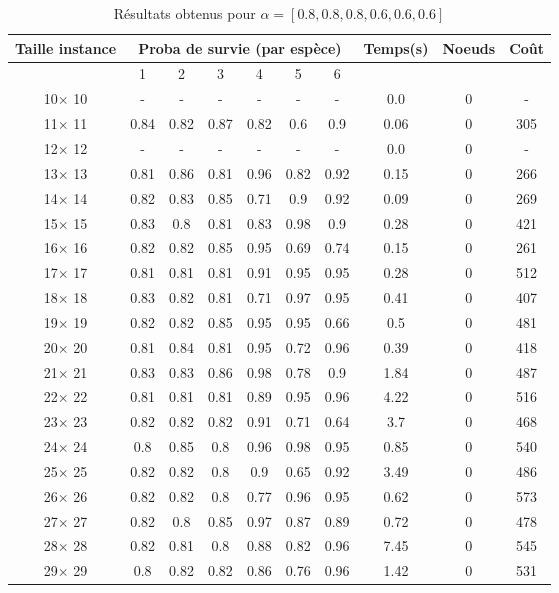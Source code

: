 \documentclass[main.tex]{subfiles}
\begin{document}
\begin{table}
    \centering
    \caption{Résultats obtenus pour $\alpha = [0.8, 0.8, 0.8, 0.6, 0.6, 0.6]$}
    \begin{tabular}{|c|c|c|c|c|c|c|c|c|c|}
	\hline
	\textbf{Taille instance} &\multicolumn{6}{c}{\textbf{Proba de survie (par espèce)}} &\textbf{Temps(s)} &\textbf{Noeuds} &\textbf{Coût}\\
	\hline
	 &1 &2 &3 &4 &5 &6 & & &\\
	\hline

10$\times$ 10 & -  & -  & -  & -  & -  & -  &0.0 &0 & - \\
11$\times$ 11 &0.84 &0.82 &0.87 &0.82 &0.6 &0.9 &0.06 &0 &305\\
12$\times$ 12 & -  & -  & -  & -  & -  & -  &0.0 &0 & - \\
13$\times$ 13 &0.81 &0.86 &0.81 &0.96 &0.82 &0.92 &0.15 &0 &266\\
14$\times$ 14 &0.82 &0.83 &0.85 &0.71 &0.9 &0.92 &0.09 &0 &269\\
15$\times$ 15 &0.83 &0.8 &0.81 &0.83 &0.98 &0.9 &0.28 &0 &421\\
16$\times$ 16 &0.82 &0.82 &0.85 &0.95 &0.69 &0.74 &0.15 &0 &261\\
17$\times$ 17 &0.81 &0.81 &0.81 &0.91 &0.95 &0.95 &0.28 &0 &512\\
18$\times$ 18 &0.83 &0.82 &0.81 &0.71 &0.97 &0.95 &0.41 &0 &407\\
19$\times$ 19 &0.82 &0.82 &0.85 &0.95 &0.95 &0.66 &0.5 &0 &481\\
20$\times$ 20 &0.81 &0.84 &0.81 &0.95 &0.72 &0.96 &0.39 &0 &418\\
21$\times$ 21 &0.83 &0.83 &0.86 &0.98 &0.78 &0.9 &1.84 &0 &487\\
22$\times$ 22 &0.81 &0.81 &0.81 &0.89 &0.95 &0.96 &4.22 &0 &516\\
23$\times$ 23 &0.82 &0.82 &0.82 &0.91 &0.71 &0.64 &3.7 &0 &468\\
24$\times$ 24 &0.8 &0.85 &0.8 &0.96 &0.98 &0.95 &0.85 &0 &540\\
25$\times$ 25 &0.82 &0.82 &0.8 &0.9 &0.65 &0.92 &3.49 &0 &486\\
26$\times$ 26 &0.82 &0.82 &0.8 &0.77 &0.96 &0.95 &0.62 &0 &573\\
27$\times$ 27 &0.82 &0.8 &0.85 &0.97 &0.87 &0.89 &0.72 &0 &478\\
28$\times$ 28 &0.82 &0.81 &0.8 &0.88 &0.82 &0.96 &7.45 &0 &545\\
29$\times$ 29 &0.8 &0.82 &0.82 &0.86 &0.76 &0.96 &1.42 &0 &531\\

\end{tabular}
\end{table}
\end{document}
